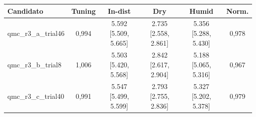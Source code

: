 \begin{tabular}{l c c c c c}
\hline
\textbf{Candidato} & \textbf{Tuning} & \textbf{In-dist} & \textbf{Dry} & \textbf{Humid} & \textbf{Norm.} \\ \hline
qmc\_r3\_a\_trial46 & 0,994 & 5.592 [5.509, 5.665] & 2.735 [2.558, 2.861] & 5.356 [5.288, 5.430] & 0,978 \\
qmc\_r3\_b\_trial8 & 1,006 & 5.503 [5.420, 5.568] & 2.842 [2.617, 2.904] & 5.188 [5.065, 5.316] & 0,967 \\
qmc\_r3\_c\_trial40 & 0,991 & 5.547 [5.499, 5.599] & 2.793 [2.755, 2.836] & 5.327 [5.202, 5.378] & 0,979 \\
\hline
\end{tabular}
